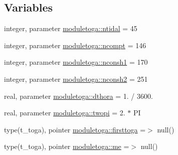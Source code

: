\subsection*{Variables}
\begin{DoxyCompactItemize}
\item 
integer, parameter \mbox{\hyperlink{namespacemoduletoga_ae4b0b997b6803ae8647fdd97f2dda666}{moduletoga\+::ntidal}} = 45
\item 
integer, parameter \mbox{\hyperlink{namespacemoduletoga_a151be23f63401a1bb1a76f0a4c30d9ca}{moduletoga\+::ncompt}} = 146
\item 
integer, parameter \mbox{\hyperlink{namespacemoduletoga_a06e41646ba24c11ab2e1b513e5c1760c}{moduletoga\+::nconsh1}} = 170
\item 
integer, parameter \mbox{\hyperlink{namespacemoduletoga_a839ff93f37eef8183b7f13edc4952154}{moduletoga\+::nconsh2}} = 251
\item 
real, parameter \mbox{\hyperlink{namespacemoduletoga_a37e0b58aa055e5f38ec1c3a3b5abcdd0}{moduletoga\+::dthora}} = 1. / 3600.
\item 
real, parameter \mbox{\hyperlink{namespacemoduletoga_a0391f4a969edf3e4f5f56b9ad111d6d0}{moduletoga\+::twopi}} = 2. $\ast$ PI
\item 
type(t\+\_\+toga), pointer \mbox{\hyperlink{namespacemoduletoga_affe7bb283aa5a25e766ceedfd0cfe3bd}{moduletoga\+::firsttoga}} =$>$ null()
\item 
type(t\+\_\+toga), pointer \mbox{\hyperlink{namespacemoduletoga_ae189511573cac5c5cde7e675f45dd4c0}{moduletoga\+::me}} =$>$ null()
\item 

\end{DoxyCompactItemize}
